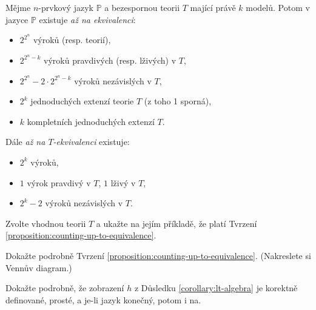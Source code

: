 \begin{proposition}\label{proposition:counting-up-to-equivalence}
Mějme $n$-prvkový jazyk $\mathbb P$ a bezespornou teorii $T$ mající právě $k$ modelů. Potom v jazyce $\mathbb P$ existuje \emph{až na ekvivalenci}:
\begin{itemize}
    \item $2^{2^n}$ výroků (resp. teorií),
    \item $2^{2^n-k}$ výroků pravdivých (resp. lživých) v $T$,
    \item $2^{2^n}-2\cdot 2^{2^n-k}$ výroků nezávislých v $T$,
    \item $2^k$ jednoduchých extenzí teorie $T$ (z toho 1 sporná),
    \item $k$ kompletních jednoduchých extenzí $T$.
\end{itemize}
Dále \emph{až na $T$-ekvivalenci} existuje:
\begin{itemize}
    \item $2^k$ výroků,
    \item $1$ výrok pravdivý v $T$, $1$ lživý v $T$,
    \item $2^k-2$ výroků nezávislých v $T$.
\end{itemize}
\end{proposition}

\begin{exercise}
    Zvolte vhodnou teorii $T$ a ukažte na jejím příkladě, že platí Tvrzení \ref{proposition:counting-up-to-equivalence}.
\end{exercise}

\begin{exercise}
    Dokažte podrobně Tvrzení \ref{proposition:counting-up-to-equivalence}. (Nakreslete si Vennův diagram.)    
\end{exercise}

\begin{exercise}
    Dokažte podrobně, že zobrazení $h$ z Důsledku \ref{corollary:lt-algebra} je korektně definované, prosté, a je-li jazyk konečný, potom i na.
\end{exercise}




